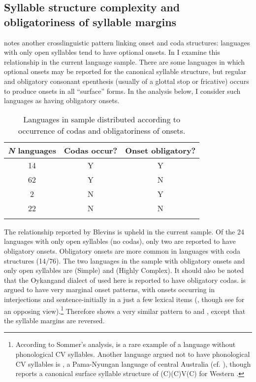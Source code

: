 \subsection{Syllable structure complexity and obligatoriness of syllable margins}\label{sec:3.3.3}

\citet[336]{Blevins2006} notes another crosslinguistic pattern linking onset and coda structures: languages with only open syllables tend to have optional onsets. In  I examine this relationship in the current language sample. There are some languages in which optional onsets may be reported for the canonical syllable structure, but regular and obligatory consonant epenthesis (usually of a glottal stop or fricative) occurs to produce onsets in all ``surface'' forms. In the analysis below, I consider such languages as having obligatory onsets.

\begin{table}
\begin{tabular}{ccc}
\lsptoprule
 \textit{N} languages & Codas occur? & Onset obligatory?\\\midrule
 14 & Y & Y\\
 62 & Y & N\\
 \phantom{1}2 & N & Y\\
 22 & N & N\\
\lspbottomrule
\end{tabular}
\caption{\label{tab:3.3}Languages in sample distributed according to occurrence of codas and obligatoriness of onsets.}
\end{table}

  The relationship reported by Blevins is upheld in the current sample. Of the 24 languages with only open syllables (no codas), only two are reported to have obligatory onsets. Obligatory onsets are more common in languages with coda structures (14/76). The two languages in the sample with obligatory onsets and only open syllables are  (Simple) and  (Highly Complex). It should also be noted that the Oykangand dialect of  used here is reported to have obligatory codas.  is argued to have very marginal onset patterns, with onsets occurring in interjections and sentence-initially in a just a few lexical items (\citealt{Sommer1969,Sommer1970,Sommer1981}, though see \citealt{Dixon1970} for an opposing view).\footnote{{According to Sommer’s analysis,  is a rare example of a language without phonological CV syllables. Another language argued not to have phonological CV syllables is , a Pama-Nyungan language of central Australia (cf. \citealt{BreenPensalfini1999}), though \citet{Anderson2000} reports a canonical surface syllable structure of (C)(C)V(C) for Western .}} Therefore  shows a very similar pattern to  and , except that the syllable margins are reversed.

